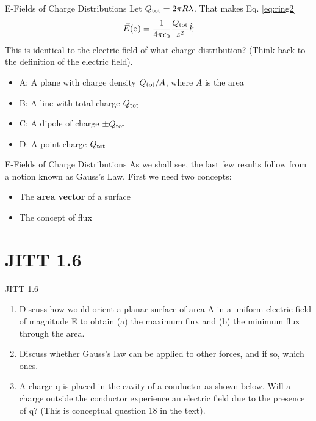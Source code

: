 \documentclass{beamer}
\begin{document}
\begin{frame}{E-Fields of Charge Distributions}
Let $Q_{\rm tot} = 2\pi R \lambda$.  That makes Eq. \ref{eq:ring2}
\begin{equation}
\vec{E}(z) = \frac{1}{4\pi\epsilon_0} \frac{Q_{\rm tot}}{z^2} \hat{k}
\end{equation}
This is identical to the electric field of what charge distribution?  (Think back to the definition of the electric field).
\begin{itemize}
\item A: A plane with charge density $Q_{\rm tot}/A$, where $A$ is the area
\item B: A line with total charge $Q_{\rm tot}$
\item C: A dipole of charge $\pm Q_{\rm tot}$
\item D: A point charge $Q_{\rm tot}$
\end{itemize}
\end{frame}

\begin{frame}{E-Fields of Charge Distributions}
As we shall see, the last few results follow from a notion known as \alert{Gauss's Law}.  First we need two concepts:
\begin{itemize}
\item The \textbf{area vector} of a surface
\item The concept of flux
\end{itemize}
\end{frame}

\section{JITT 1.6}

\begin{frame}{JITT 1.6}
\begin{enumerate}
\item Discuss how would orient a planar surface of area A in a uniform electric field of magnitude E to obtain (a) the maximum flux and (b) the minimum flux through the area.
\item Discuss whether Gauss’s law can be applied to other forces, and if so, which ones.
\item A charge q is placed in the cavity of a conductor as shown below. Will a charge outside the conductor experience an electric field due to the presence of q? (This is conceptual question 18 in the text).
\end{enumerate}
\end{frame}
\end{document}
